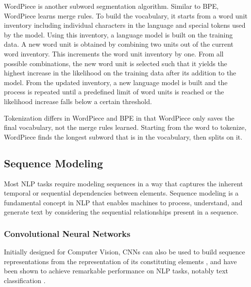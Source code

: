 WordPiece \citep{wu2016google} is another subword segmentation algorithm. Similar to \ac{BPE}, WordPiece learns merge rules. To build the vocabulary, it starts from a word unit inventory including individual characters in the language and special tokens used by the model. Using this inventory, a language model is built on the training data. A new word unit is obtained by combining two units out of the current word inventory. This increments the word unit inventory by one. From all possible combinations, the new word unit is selected such that it yields the highest increase in the likelihood on the training data after its addition to the model. From the updated inventory, a new language model is built and the process is repeated until a predefined limit of word units is reached or the likelihood increase falls below a certain threshold. 

Tokenization differs in WordPiece and \ac{BPE} in that WordPiece only saves the final vocabulary, not the merge rules learned. Starting from the word to tokenize, WordPiece finds the longest subword that is in the vocabulary, then splits on it. 


\subsection{Sequence Modeling}

Most \ac{NLP} tasks require modeling sequences in a way that captures the inherent temporal or sequential dependencies between elements. Sequence modeling is a fundamental concept in NLP that enables machines to process, understand, and generate text by considering the sequential relationships present in a sequence.

\subsubsection{Convolutional Neural Networks}

Initially designed for Computer Vision, \acp{CNN} can also be used to build sequence representations from the representation of its constituting elements \citep{collobert2008unified, kim2014convolutional}, and have been shown to achieve remarkable performance on \ac{NLP} tasks, notably text classification \citep{duque2019squeezed, wang2015semantic, liu2020multichannel}. 

